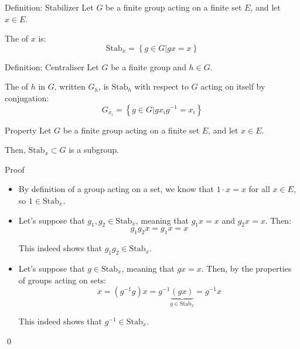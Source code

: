 \documentclass[a4paper]{article}
\begin{document}
\begin{parag}{Definition: Stabilizer}
    Let $G$ be a finite group acting on a finite set $E$, and let $x \in E$.

    The  of $x$ is: 
    \[\text{Stab}_x = \left\{g \in G | gx = x\right\}\]
\end{parag}

\begin{parag}{Definition: Centraliser}
    Let $G$ be a finite group and $h \in G$.

    The  of $h$ in $G$, written $G_h$, is $\text{Stab}_h$ with respect to $G$ acting on itself by conjugation:
    \[G_{x_i} = \left\{g \in G | g x_i g^{-1} = x_i\right\}\]
\end{parag}

\begin{parag}{Property}
    Let $G$ be a finite group acting on a finite set $E$, and let $x \in E$.

    Then, $\text{Stab}_x \subset G$ is a subgroup.

    \begin{subparag}{Proof}
        \begin{itemize}[left=0pt]
            \item By definition of a group acting on a set, we know that $1\cdot x = x$ for all $x \in E$, so $1 \in \text{Stab}_x$.
            \item Let's suppose that $g_1, g_2 \in \text{Stab}_x$, meaning that $g_1 x = x$ and $g_2 x = x$. Then: 
            \[g_1 g_2 x = g_1 x = x\]
            
            This indeed shows that $g_1 g_2 \in \text{Stab}_x$.
            \item Let's suppose that $g \in \text{Stab}_x$, meaning that $gx = x$. Then, by the properties of groups acting on sets: 
            \[x = \left(g^{-1} g\right)x = g^{-1} \underbrace{\left(g x\right)}_{g \in \text{Stab}_x} = g^{-1} x\]
            
            This indeed shows that $g^{-1} \in \text{Stab}_x$.
        \end{itemize}
        
        \qed
    \end{subparag}
\end{parag}
\end{document}

